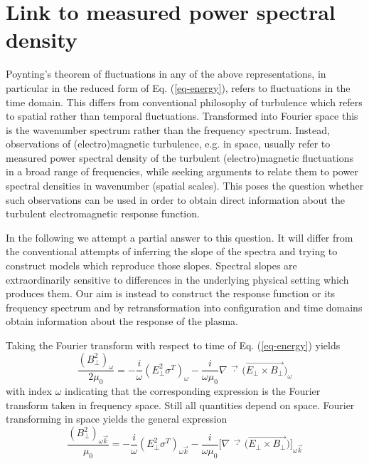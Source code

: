\documentclass[ ]{copernicus2}
\begin{document}
{\section{Link to measured power spectral density}
{Poynting's theorem of fluctuations in any of the above representations, in particular in the reduced form of Eq. (\ref{eq-energy}), refers to fluctuations in the time domain. This differs from conventional philosophy of turbulence which refers to spatial rather than temporal fluctuations. Transformed into Fourier space this is the wavenumber spectrum rather than the frequency spectrum.  Instead, observations of (electro)magnetic turbulence, e.g. in space, usually refer to measured power spectral density of the turbulent (electro)magnetic fluctuations in a broad range of} frequencies, {while seeking arguments to relate them to power spectral densities in wavenumber (spatial scales). This poses the question whether such observations can be used in order to obtain direct information about the turbulent electromagnetic response function.} 

In the following we {attempt a partial answer to this question}. It will differ from the conventional attempts of inferring the slope of the spectra and trying to construct models which reproduce those slopes. {Spectral slopes are extraordinarily sensitive to differences in the underlying physical setting which produces them.} Our aim is instead to construct the response function or its frequency spectrum and by retransformation into configuration and time domains obtain information about the response of the plasma. 

Taking the Fourier transform with respect to time of Eq. (\ref{eq-energy}) yields
\begin{equation}\label{eq-non}
\frac{(B_\perp^2)_\omega}{2\mu_0}=-\frac{i}{\omega}(E_\perp^2\sigma^T)_\omega-\frac{i}{\omega\mu_0}\nabla\ \vec{\cdot}\ \Big(\vec{E_\perp\times B_\perp}\Big)_\omega
\end{equation}
with index $\omega$ indicating that the corresponding expression is the Fourier transform taken in frequency space. Still all quantities depend on space. Fourier transforming in space yields the general expression
\begin{equation}\label{general}
\frac{(B_\perp^2)_{\omega\vec{k}}}{\mu_0}=-\frac{i}{\omega}(E_\perp^2\sigma^T)_{\omega\vec{k}}-\frac{i}{\omega\mu_0}
\Big[ \nabla\  \vec{\cdot}\:\Big(\vec{E_\perp\times B_\perp}\Big)\Big]_{\omega\vec{k}}
\end{equation}


}
\end{document}
